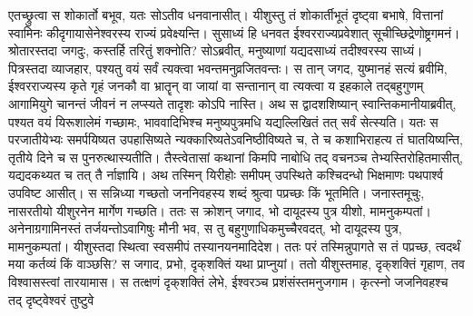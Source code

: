 \vakya एतच्छ्रुत्वा स शोकार्तो बभूव, यतः सोऽतीव धनवानासीत्।
\vakya यीशुस्तु तं शोकार्तीभूतं दृष्ट्वा बभाषे, वित्तानां स्वामिनः कीदृगायासेनेश्वरस्य राज्यं प्रवेक्ष्यन्ति।
\vakya सुसाध्यं हि धनवत ईश्वरराज्यप्रवेशात् सूचीच्छिद्रेणोष्ट्रगमनं।
\vakya श्रोतारस्तदा जगदुः, कस्तर्हि तरितुं शक्नोति?
\vakya सोऽब्रवीत्, मनुष्याणां यद्यदसाध्यं तदीश्वरस्य साध्यं।
\vakya पित्रस्तदा व्याजहार, पश्यतु वयं सर्वं त्यक्त्वा भवन्तमनुव्रजितवन्तः।
\vakya स तान् जगद, युष्मानहं सत्यं ब्रवीमि, ईश्वरराज्यस्य कृते गृहं जनकौ वा भ्रातॄन् वा जायां वा सन्तानान् वा
\vakya त्यक्त्वा य इहकाले तद्बहुगुणम् आगामियुगे चानन्तं जीवनं न लप्स्यते तादृशः कोऽपि नास्ति।
\vakya अथ स द्वादशशिष्यान् स्वान्तिकमानीयाब्रवीत्, पश्यत वयं यिरूशालेमं गच्छामः, भाववादिभिश्च मनुष्यपुत्रमधि यद्यल्लिखितं तत् सर्वं सेत्स्यति।
\vakya यतः स परजातीयेभ्यः समर्पयिष्यत उपहासिष्यते न्यक्कारिष्यतेऽवनिष्ठीविष्यते च,
\vakya ते च कशाभिराहत्य तं घातयिष्यन्ति, तृतीये दिने च स पुनरुत्थास्यतीति।
\vakya तैस्त्वेतासां कथानां किमपि नाबोधि तद् वचनञ्च तेभ्यस्तिरोहितमासीत्, यद्यदकथ्यत च तत् तै र्नाज्ञायि।
\vakya अथ तस्मिन् यिरीहोः समीपम् उपस्थिते कश्चिदन्धो भिक्षमाणः पथपार्श्व उपविष्ट आसीत्।
\vakya स सन्निध्या गच्छतो जननिवहस्य शब्दं श्रुत्वा पप्रच्छः किं भूतमिति।
\vakya जनास्तमूचुः, नासरतीयो यीशुरनेन मार्गेण गच्छति।
\vakya ततः स क्रोशन् जगाद, भो दायूदस्य पुत्र यीशो, मामनुकम्पतां।
\vakya अनेनाग्रगामिनस्तं तर्जयन्तोऽवागिषुः मौनी भव, स तु बहुगुणाधिकमुच्चैरवदत्, भो दायूदस्य पुत्र, मामनुकम्पतां।
\vakya यीशुस्तदा स्थित्वा स्वसमीपं तस्यानयनमादिदेश।
\vakya ततः परं तस्मिन्नुपागते स तं पप्रच्छ, त्वदर्थं मया कर्तव्यं किं वाञ्छसि? स जगाद, प्रभो, दृक्‌शक्तिं यथा प्राप्नुयां।
\vakya ततो यीशुस्तमाह, दृक्‌शक्तिं गृहाण, तव विश्वासस्त्वां तारयामास।
\vakya स तत्क्षणं दृक्‌शक्तिं लेभे, ईश्वरञ्च प्रशंसंस्तमनुजगाम। कृत्स्नो जजनिवहश्च तद् दृष्ट्वेश्वरं तुष्टुवे\eoc